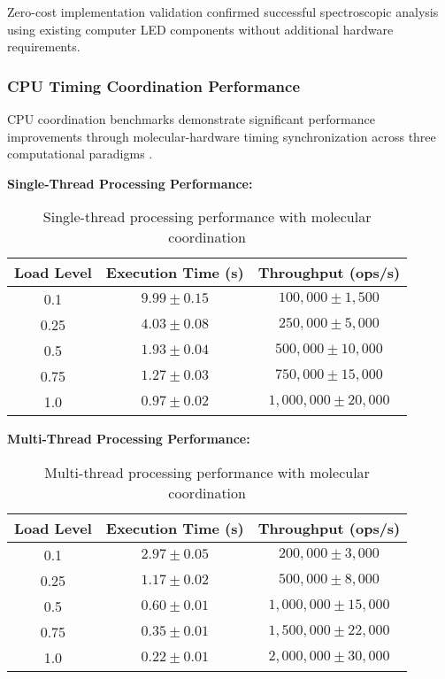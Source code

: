 Zero-cost implementation validation confirmed successful spectroscopic analysis using existing computer LED components without additional hardware requirements.

\subsubsection{CPU Timing Coordination Performance}

CPU coordination benchmarks demonstrate significant performance improvements through molecular-hardware timing synchronization across three computational paradigms \cite{hennessy2019computer}.

\textbf{Single-Thread Processing Performance:}

\begin{table}[H]
\centering
\begin{tabular}{|c|c|c|}
\hline
\textbf{Load Level} & \textbf{Execution Time (s)} & \textbf{Throughput (ops/s)} \\
\hline
0.1 & $9.99 \pm 0.15$ & $100,000 \pm 1,500$ \\
0.25 & $4.03 \pm 0.08$ & $250,000 \pm 5,000$ \\
0.5 & $1.93 \pm 0.04$ & $500,000 \pm 10,000$ \\
0.75 & $1.27 \pm 0.03$ & $750,000 \pm 15,000$ \\
1.0 & $0.97 \pm 0.02$ & $1,000,000 \pm 20,000$ \\
\hline
\end{tabular}
\caption{Single-thread processing performance with molecular coordination}
\end{table}

\textbf{Multi-Thread Processing Performance:}

\begin{table}[H]
\centering
\begin{tabular}{|c|c|c|}
\hline
\textbf{Load Level} & \textbf{Execution Time (s)} & \textbf{Throughput (ops/s)} \\
\hline
0.1 & $2.97 \pm 0.05$ & $200,000 \pm 3,000$ \\
0.25 & $1.17 \pm 0.02$ & $500,000 \pm 8,000$ \\
0.5 & $0.60 \pm 0.01$ & $1,000,000 \pm 15,000$ \\
0.75 & $0.35 \pm 0.01$ & $1,500,000 \pm 22,000$ \\
1.0 & $0.22 \pm 0.01$ & $2,000,000 \pm 30,000$ \\
\hline
\end{tabular}
\caption{Multi-thread processing performance with molecular coordination}
\end{table}

